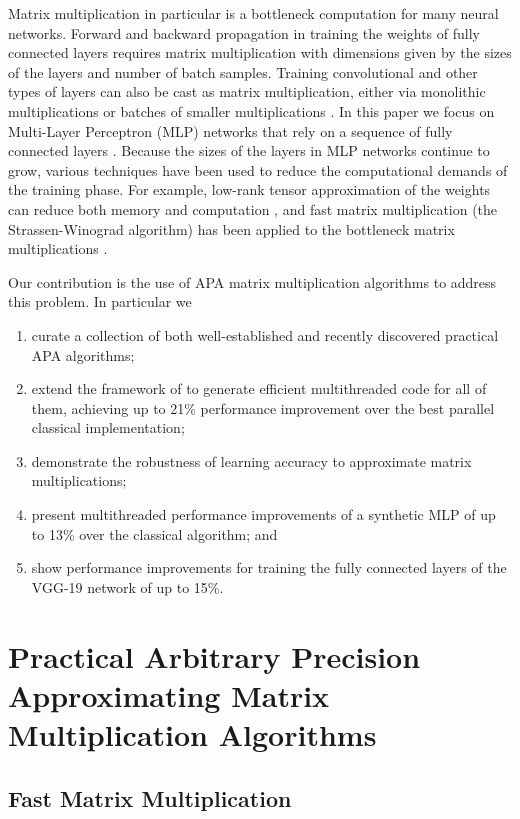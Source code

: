 \documentclass[sigconf,review,anonymous]{acmart}
\begin{document}
Matrix multiplication in particular is a bottleneck computation for many neural networks.
Forward and backward propagation in training the weights of fully connected layers requires matrix multiplication with dimensions given by the sizes of the layers and number of batch samples.
Training convolutional and other types of layers can also be cast as matrix multiplication, either via monolithic multiplications or batches of smaller multiplications \cite{CW+14,GB+19}.
In this paper we focus on Multi-Layer Perceptron (MLP) networks that rely on a sequence of fully connected layers \cite{HSW89}.
Because the sizes of the layers in MLP networks continue to grow, various techniques have been used to reduce the computational demands of the training phase.
For example, low-rank tensor approximation of the weights can reduce both memory and computation \cite{NPOV15}, and fast matrix multiplication (the Strassen-Winograd algorithm) has been applied to the bottleneck matrix multiplications \cite{KAA20}.

Our contribution is the use of APA matrix multiplication algorithms to address this problem.
In particular we
\begin{enumerate}
	\item curate a collection of both well-established and recently discovered practical APA algorithms;
	\item extend the framework of \cite{BB15} to generate efficient multithreaded code for all of them, achieving up to 21\% performance improvement over the best parallel classical implementation;
	\item demonstrate the robustness of learning accuracy to approximate matrix multiplications;
	\item present multithreaded performance improvements of a synthetic MLP of up to 13\% over the classical algorithm; and
	\item show performance improvements for training the fully connected layers of the VGG-19 network of up to 15\%.
\end{enumerate}

\section{Practical Arbitrary Precision Approximating Matrix Multiplication Algorithms}
\label{sec:APA}

\subsection{Fast Matrix Multiplication}
\end{document}

